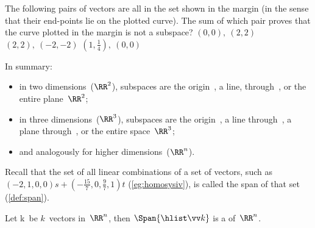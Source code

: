\begin{activity}
The following pairs of vectors are all in the set shown in the margin (in the sense that their end-points lie on the plotted curve).  
%
The sum of which pair proves that the curve plotted in the margin is not a subspace?
{\((0,0),\ (2,2)\)}
{\((2,2),\ (-2,-2)\)}
{\((1,\frac14),\ (0,0)\)}
\end{activity}




In summary:
\begin{itemize}
\item in two dimensions~(\(\RR^2\)), subspaces are the origin~\ov, a line, through~\ov, or the entire plane~\(\RR^2\);
\item in three dimensions~(\(\RR^3\)), subspaces are the origin~\ov, a line through~\ov, a plane through~\ov, or the entire space~\(\RR^3\);
\item and analogously for higher dimensions~(\(\RR^n\)).
\end{itemize}


Recall that the set of all linear combinations of a set of vectors, such as \((-2,1,0,0)s+(-\frac{15}7,0,\frac97,1)t\) (\autoref{eg:homosysiv}), is called the span of that set (\autoref{def:span}).

\begin{theorem} \label{thm:spansubs} 
Let \hlist\vv k\ be \(k\)~vectors in~\(\RR^n\),
then \(\Span\{\hlist\vv k\}\) is a  of~\(\RR^n\).
\end{theorem}

